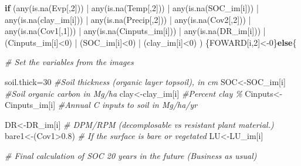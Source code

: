 \documentclass[
  10pt,
  b5paper,
]{book}
\newenvironment{Shaded}{\begin{snugshade}}{\end{snugshade}}
\newcommand{\CommentTok}[1]{\textcolor[rgb]{0.56,0.35,0.01}{\textit{#1}}}
\newcommand{\ControlFlowTok}[1]{\textcolor[rgb]{0.13,0.29,0.53}{\textbf{#1}}}
\newcommand{\DecValTok}[1]{\textcolor[rgb]{0.00,0.00,0.81}{#1}}
\newcommand{\FloatTok}[1]{\textcolor[rgb]{0.00,0.00,0.81}{#1}}
\newcommand{\FunctionTok}[1]{\textcolor[rgb]{0.00,0.00,0.00}{#1}}
\newcommand{\NormalTok}[1]{#1}
\newcommand{\OtherTok}[1]{\textcolor[rgb]{0.56,0.35,0.01}{#1}}
\newcommand{\SpecialCharTok}[1]{\textcolor[rgb]{0.00,0.00,0.00}{#1}}
\begin{document}
\begin{Shaded}
\begin{Highlighting}[]
\ControlFlowTok{if}\NormalTok{ (}\FunctionTok{any}\NormalTok{(}\FunctionTok{is.na}\NormalTok{(Evp[,}\DecValTok{2}\NormalTok{])) }\SpecialCharTok{|} \FunctionTok{any}\NormalTok{(}\FunctionTok{is.na}\NormalTok{(Temp[,}\DecValTok{2}\NormalTok{])) }\SpecialCharTok{|} \FunctionTok{any}\NormalTok{(}\FunctionTok{is.na}\NormalTok{(SOC\_im[i])) }\SpecialCharTok{|} \FunctionTok{any}\NormalTok{(}\FunctionTok{is.na}\NormalTok{(clay\_im[i])) }\SpecialCharTok{|} \FunctionTok{any}\NormalTok{(}\FunctionTok{is.na}\NormalTok{(Precip[,}\DecValTok{2}\NormalTok{]))  }\SpecialCharTok{|}  \FunctionTok{any}\NormalTok{(}\FunctionTok{is.na}\NormalTok{(Cov2[,}\DecValTok{2}\NormalTok{]))  }\SpecialCharTok{|}  \FunctionTok{any}\NormalTok{(}\FunctionTok{is.na}\NormalTok{(Cov1[,}\DecValTok{1}\NormalTok{])) }\SpecialCharTok{|} \FunctionTok{any}\NormalTok{(}\FunctionTok{is.na}\NormalTok{(Cinputs\_im[i])) }\SpecialCharTok{|} \FunctionTok{any}\NormalTok{(}\FunctionTok{is.na}\NormalTok{(DR\_im[i])) }\SpecialCharTok{|}\NormalTok{ (Cinputs\_im[i]}\SpecialCharTok{\textless{}}\DecValTok{0}\NormalTok{) }\SpecialCharTok{|}\NormalTok{  (SOC\_im[i]}\SpecialCharTok{\textless{}}\DecValTok{0}\NormalTok{) }\SpecialCharTok{|}\NormalTok{ (clay\_im[i]}\SpecialCharTok{\textless{}}\DecValTok{0}\NormalTok{) ) \{FOWARD[i,}\DecValTok{2}\NormalTok{]}\OtherTok{\textless{}{-}}\DecValTok{0}\NormalTok{\}}\ControlFlowTok{else}\NormalTok{\{}


\CommentTok{\# Set the variables from the images}

\NormalTok{soil.thick}\OtherTok{=}\DecValTok{30}  \CommentTok{\#Soil thickness (organic layer topsoil), in cm}
\NormalTok{SOC}\OtherTok{\textless{}{-}}\NormalTok{SOC\_im[i]      }\CommentTok{\#Soil organic carbon in Mg/ha }
\NormalTok{clay}\OtherTok{\textless{}{-}}\NormalTok{clay\_im[i]        }\CommentTok{\#Percent clay \%}
\NormalTok{Cinputs}\OtherTok{\textless{}{-}}\NormalTok{Cinputs\_im[i]    }\CommentTok{\#Annual C inputs to soil in Mg/ha/yr}

\NormalTok{DR}\OtherTok{\textless{}{-}}\NormalTok{DR\_im[i]              }\CommentTok{\# DPM/RPM (decomplosable vs resistant plant material.)}
\NormalTok{bare1}\OtherTok{\textless{}{-}}\NormalTok{(Cov1}\SpecialCharTok{\textgreater{}}\FloatTok{0.8}\NormalTok{)           }\CommentTok{\# If the surface is bare or vegetated}
\NormalTok{LU}\OtherTok{\textless{}{-}}\NormalTok{LU\_im[i]}

\CommentTok{\# Final calculation of SOC  20 years in the future  (Business as usual)}


\end{Highlighting}
\end{Shaded}
\end{document}

